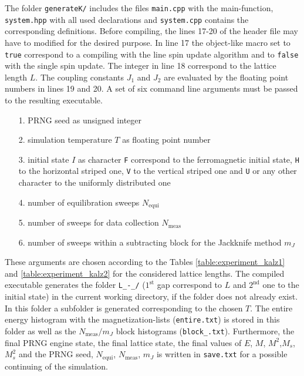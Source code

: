 The folder \verb|generateK/| includes the files \verb|main.cpp| with the main-function, \verb|system.hpp| with all used declarations and \verb|system.cpp|
contains the corresponding definitions. Before compiling, the lines 17-20 of the header file may have to modified for the desired purpose. In line 17 the object-like macro 
set to \verb|true| correspond to a compiling with the line spin update algorithm and to \verb|false| with the single spin update. The integer in 
line 18 correspond to the lattice length $L$. The coupling constants $J_1$ and $J_2$ are evaluated by the floating point numbers in lines 19 and 20.
A set of six command line arguments must be passed to the resulting executable.
\begin{itemize}
  \item[1.] PRNG seed as unsigned integer 
  \item[2.] simulation temperature $T$ as floating point number
  \item[3.] initial state $I$ as character \verb|F| correspond to the ferromagnetic initial state, \verb|H| to the horizontal striped one, \verb|V| to the
             vertical striped one and \verb|U| or any other character to the uniformly distributed one
  \item[4.] number of equilibration sweeps $N_\mathrm{equi}$
  \item[5.] number of sweeps for data collection  $N_\mathrm{meas}$
  \item[6.] number of sweeps within a subtracting block for the Jackknife method $m_J$
\end{itemize}
These arguments are chosen according to the Tables \ref{table:experiment_kalz1} and \ref{table:experiment_kalz2} for the considered lattice lengths. The compiled 
executable generates the folder
\verb|L_-_/| ($1^\text{st}$ gap correspond to $L$ and $2^\text{nd}$ one to the initial state) in the current working directory, if the folder does not already exist. In this folder a 
subfolder is generated corresponding to the chosen $T$. The entire energy histogram with the magnetization-lists (\verb|entire.txt|) is stored
in this folder as well as the $N_\mathrm{meas}/m_J$ block histograms (\verb|block_.txt|). Furthermore, the final PRNG engine state, the final lattice state, the final values 
of $E$, $M$, $M^2$,$M_s$, $M^2_s$ and the PRNG seed, $N_\mathrm{equi}$, $N_\mathrm{meas}$, $m_J$ is written in \verb|save.txt| for a possible continuing of
the simulation.  

